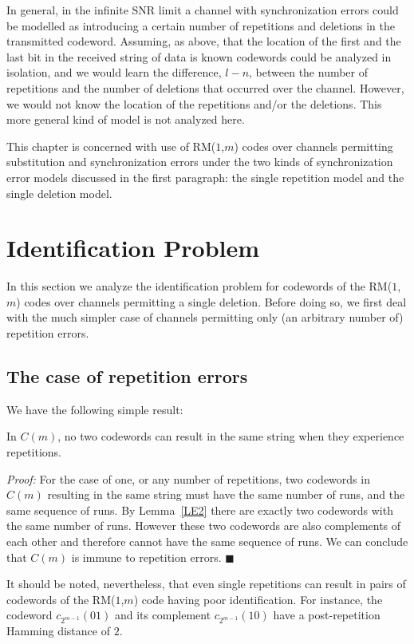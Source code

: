 In general, in the infinite SNR limit a channel with
synchronization errors could be modelled as introducing a certain
number of repetitions and deletions in the transmitted codeword.
Assuming, as above, that the location of the first and the last
bit in the received string of data is known codewords could be
analyzed in isolation, and we would learn the difference, $l -n$,
between the number of repetitions and the number of deletions that
occurred over the channel. However, we would not know the location
of the repetitions and/or the deletions. This more general kind of
model is not analyzed here.

This chapter is concerned with use of RM($1$,$m$) codes over
channels permitting substitution and synchronization errors under
the two kinds of synchronization error models discussed in the first
paragraph: the single repetition model and the single deletion
model.
\section{Identification Problem}\label{sectionid}

In this section we analyze the identification problem for
codewords of the RM($1$,$m$) codes over channels permitting a
single deletion. Before doing so, we first deal with the much
simpler case of channels permitting only (an arbitrary number of)
repetition errors.

\subsection{The case of repetition errors}

We have the following simple result:

\begin{theorem}\label{THE1} In $C(m)$, no two codewords can result
in the same string when they experience repetitions.
\end{theorem}

\noindent \textit{Proof:} For the case of one, or any number of
repetitions, two codewords in $C(m)$ resulting in the same string
must have the same number of runs, and the same sequence of runs.
By Lemma~\ref{LE2} there are exactly two codewords with the same
number of runs. However these two codewords are also complements
of each other and therefore cannot have the same sequence of runs.
We can conclude that $C(m)$ is immune to repetition errors. \hfill
$\blacksquare$

It should be noted, nevertheless, that even single repetitions can
result in pairs of codewords of the RM($1$,$m$) code having poor
identification. For instance, the codeword $c_{2^{m-1}}(01)$ and
its complement $c_{2^{m-1}}(10)$ have a post-repetition Hamming
distance of $2$.

